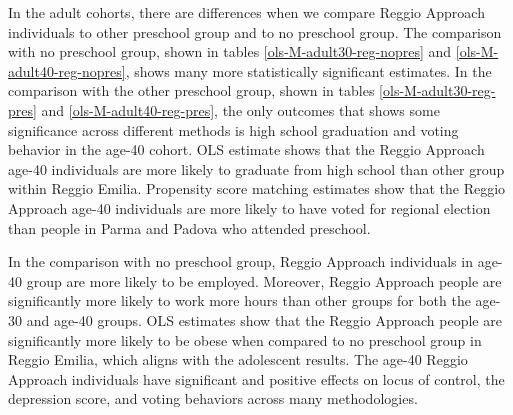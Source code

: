 In the adult cohorts, there are differences when we compare Reggio Approach individuals to other preschool group and to no preschool group. The comparison with no preschool group, shown in tables \ref{ols-M-adult30-reg-nopres} and \ref{ols-M-adult40-reg-nopres}, shows many more statistically significant estimates. In the comparison with the other preschool group, shown in tables \ref{ols-M-adult30-reg-pres} and \ref{ols-M-adult40-reg-pres}, the only outcomes that shows some significance across different methods is high school graduation and voting behavior in the age-40 cohort. OLS estimate shows that the Reggio Approach age-40 individuals are more likely to graduate from high school than other group within Reggio Emilia. Propensity score matching estimates show that the Reggio Approach age-40 individuals are more likely to have voted for regional election than people in Parma and Padova who attended preschool.

In the comparison with no preschool group, Reggio Approach individuals in age-40 group are more likely to be employed. Moreover, Reggio Approach people are significantly more likely to work more hours than other groups for both the age-30 and age-40 groups. OLS estimates show that the Reggio Approach people are significantly more likely to be obese when compared to no preschool group in Reggio Emilia, which aligns with the adolescent results. The age-40 Reggio Approach individuals have significant and positive effects on locus of control, the depression score, and voting behaviors across many methodologies.



